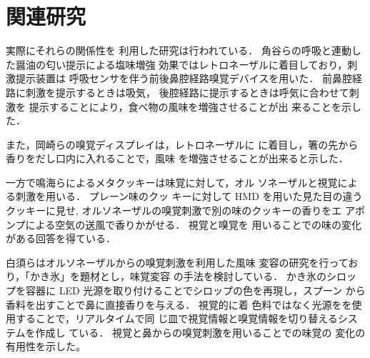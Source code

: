 \section{関連研究}

実際にそれらの関係性を
利用した研究は行われている．
角谷らの呼吸と連動した醤油の匂い提示による塩味増強
効果\cite{enmi}ではレトロネーザルに着目しており，刺激提示装置は
呼吸センサを伴う前後鼻腔経路嗅覚デバイスを用いた． 
前鼻腔経路に刺激を提示するときは吸気，
後腔経路に提示するときは呼気に合わせて刺激を
提示することにより，食べ物の風味を増強させることが出
来ることを示した．


また，岡崎らの嗅覚ディスプレイ\cite{hasi}は，レトロネーザルに
に着目し，箸の先から香りをだし口内に入れることで，風味
を増強させることが出来ると示した．


一方で鳴海らによるメタクッキー\cite{narumi2}は味覚に対して，オル
ソネーザルと視覚による刺激を用いる． プレーン味のクッ
キーに対して HMD を用いた見た目の違うクッキーに見せ,
オルソネーザルの嗅覚刺激で別の味のクッキーの香りをエ
アポンプによる空気の送風で香りかがせる． 視覚と嗅覚を
用いることでの味の変化がある回答を得ている．


白須らはオルソネーザルからの嗅覚刺激を利用した風味
変容の研究\cite{fan}\cite{pomp}を行っており，「かき氷」を題材とし，味覚変容
の手法を検討している． かき氷のシロップを容器に LED
光源を取り付けることでシロップの色を再現し，スプーン
から香料を出すことで鼻に直接香りを与える． 視覚的に着
色料ではなく光源をを使用することで，リアルタイムで同
じ皿で視覚情報と嗅覚情報を切り替えるシステムを作成し
ている． 視覚と鼻からの嗅覚刺激を用いることでの味覚の
変化の有用性を示した。
